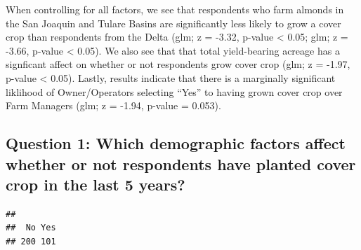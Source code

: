 \documentclass[12pt,]{article}
\newenvironment{Shaded}{\begin{snugshade}}{\end{snugshade}}
\newcommand{\KeywordTok}[1]{\textcolor[rgb]{0.13,0.29,0.53}{\textbf{#1}}}
\newcommand{\DataTypeTok}[1]{\textcolor[rgb]{0.13,0.29,0.53}{#1}}
\newcommand{\StringTok}[1]{\textcolor[rgb]{0.31,0.60,0.02}{#1}}
\newcommand{\CommentTok}[1]{\textcolor[rgb]{0.56,0.35,0.01}{\textit{#1}}}
\newcommand{\OtherTok}[1]{\textcolor[rgb]{0.56,0.35,0.01}{#1}}
\newcommand{\OperatorTok}[1]{\textcolor[rgb]{0.81,0.36,0.00}{\textbf{#1}}}
\newcommand{\NormalTok}[1]{#1}
\begin{document}
When controlling for all factors, we see that respondents who farm
almonds in the San Joaquin and Tulare Basins are significantly less
likely to grow a cover crop than respondents from the Delta (glm; z =
-3.32, p-value \textless{} 0.05; glm; z = -3.66, p-value \textless{}
0.05). We also see that that total yield-bearing acreage has a
signficant affect on whether or not respondents grow cover crop (glm; z
= -1.97, p-value \textless{} 0.05). Lastly, results indicate that there
is a marginally significant liklihood of Owner/Operators selecting
``Yes'' to having grown cover crop over Farm Managers (glm; z = -1.94,
p-value = 0.053).

\subsection{Question 1: Which demographic factors affect whether or not
respondents have planted cover crop in the last 5
years?}\label{question-1-which-demographic-factors-affect-whether-or-not-respondents-have-planted-cover-crop-in-the-last-5-years}

\begin{Shaded}
\end{Shaded}

\begin{verbatim}
## 
##  No Yes 
## 200 101
\end{verbatim}

\begin{Shaded}
\end{Shaded}
\end{document}
